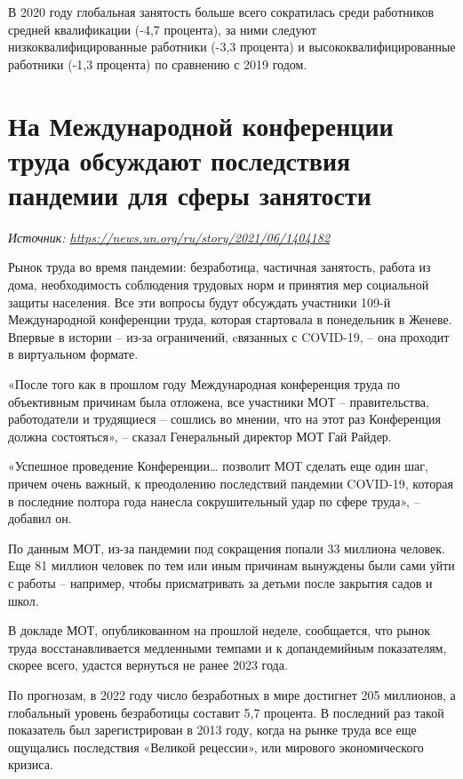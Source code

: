 В 2020 году глобальная занятость больше всего сократилась среди работников средней квалификации (-4,7 процента), за ними следуют низкоквалифицированные работники (-3,3 процента) и высококвалифицированные работники (-1,3 процента) по сравнению с 2019 годом.


\newpage
\section[Последствия пандемии для сферы занятости]{На Международной конференции труда обсуждают последствия пандемии для сферы занятости}

\textit{Источник: \url{https://news.un.org/ru/story/2021/06/1404182}}

\begin{fancyquotes}
    Рынок труда во время пандемии: безработица, частичная занятость, работа из дома, необходимость соблюдения трудовых норм и принятия мер социальной защиты населения. Все эти вопросы будут обсуждать участники 109-й Международной конференции труда, которая стартовала в понедельник в Женеве. Впервые в истории – из-за ограничений, cвязанных с COVID-19, – она проходит в виртуальном формате.
\end{fancyquotes}

«После того как в прошлом году Международная конференция труда по объективным причинам была отложена, все участники МОТ – правительства, работодатели и трудящиеся – сошлись во мнении, что на этот раз Конференция должна состояться», – сказал Генеральный директор МОТ Гай Райдер.


«Успешное проведение Конференции… позволит МОТ сделать еще один шаг, причем очень важный, к преодолению последствий пандемии COVID-19, которая в последние полтора года нанесла сокрушительный удар по сфере труда», – добавил он.

По данным МОТ, из-за пандемии под сокращения попали 33 миллиона человек. Еще 81 миллион человек по тем или иным причинам вынуждены были сами уйти с работы – например, чтобы присматривать за детьми после закрытия садов и школ.

В докладе МОТ, опубликованном на прошлой неделе, сообщается, что рынок труда восстанавливается медленными темпами и к допандемийным показателям, скорее всего, удастся вернуться не ранее 2023 года.

По прогнозам, в 2022 году число безработных в мире достигнет 205 миллионов, а глобальный уровень безработицы составит 5,7 процента. В последний раз такой показатель был зарегистрирован в 2013 году, когда на рынке труда все еще ощущались последствия «Великой рецессии», или мирового экономического кризиса.

